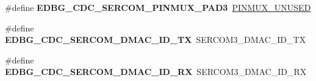 \begin{DoxyCompactItemize}
\item 
\hypertarget{group__saml21__xplained__pro__features__group_gadafc03032e3b6cbd5ad8f2030a86d9be}{}\#define {\bfseries E\+D\+B\+G\+\_\+\+C\+D\+C\+\_\+\+S\+E\+R\+C\+O\+M\+\_\+\+P\+I\+N\+M\+U\+X\+\_\+\+P\+A\+D3}~\hyperlink{group__asfdoc__sam0__sercom__usart__group_gaffde9ff712058ef836127e1f3368889e}{P\+I\+N\+M\+U\+X\+\_\+\+U\+N\+U\+S\+E\+D}\label{group__saml21__xplained__pro__features__group_gadafc03032e3b6cbd5ad8f2030a86d9be}

\item 
\hypertarget{group__saml21__xplained__pro__features__group_gabafb5d80e38ef219cb0b766044a18a56}{}\#define {\bfseries E\+D\+B\+G\+\_\+\+C\+D\+C\+\_\+\+S\+E\+R\+C\+O\+M\+\_\+\+D\+M\+A\+C\+\_\+\+I\+D\+\_\+\+T\+X}~S\+E\+R\+C\+O\+M3\+\_\+\+D\+M\+A\+C\+\_\+\+I\+D\+\_\+\+T\+X\label{group__saml21__xplained__pro__features__group_gabafb5d80e38ef219cb0b766044a18a56}

\item 
\hypertarget{group__saml21__xplained__pro__features__group_gaf82cc8d180b81a0cd53a6508da573ca2}{}\#define {\bfseries E\+D\+B\+G\+\_\+\+C\+D\+C\+\_\+\+S\+E\+R\+C\+O\+M\+\_\+\+D\+M\+A\+C\+\_\+\+I\+D\+\_\+\+R\+X}~S\+E\+R\+C\+O\+M3\+\_\+\+D\+M\+A\+C\+\_\+\+I\+D\+\_\+\+R\+X\label{group__saml21__xplained__pro__features__group_gaf82cc8d180b81a0cd53a6508da573ca2}

\end{DoxyCompactItemize}
